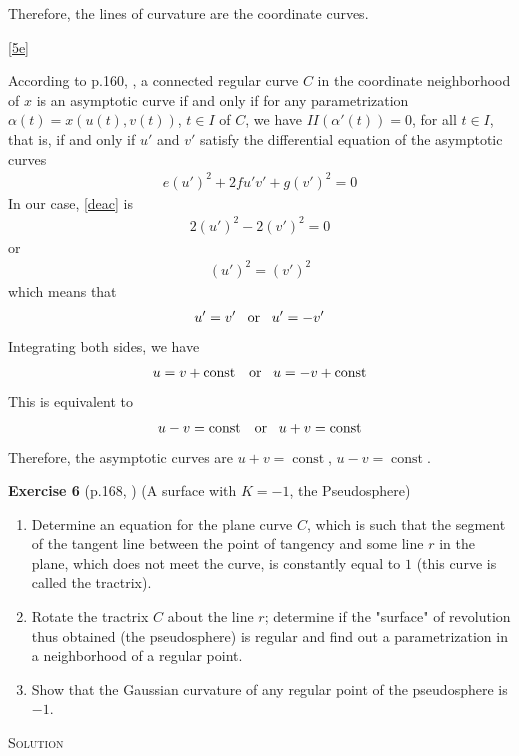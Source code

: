 \documentclass[a4paper]{report}
\DeclareMathOperator{\const}{const}
\begin{document}
Therefore, the lines of curvature are the coordinate curves.

\ref{5e}

According to p.160, \cite{2}, a connected regular curve $C$ in the coordinate neighborhood of $x$ is an asymptotic curve if and only if for any parametrization $\alpha(t) = x(u(t), v(t))$, $t \in I$ of $C$, we have $II(\alpha'(t)) = 0$, for all $t \in I$, that is, if and only if $u'$ and $v'$ satisfy the differential equation of the asymptotic curves
\begin{align}
	\label{deac}
	e(u′)^2 + 2fu′v′ + g(v′)^2 = 0
\end{align}
In our case, \eqref{deac} is
\begin{align}
2(u′)^2 - 2(v′)^2 = 0
\end{align}
or
\begin{align}
	\label{deac_1}
	(u′)^2 = (v′)^2
\end{align}
which means that
\begin{align}
	u' = v' \enskip\mbox{ or }\enskip u' = -v'
\end{align}
Integrating both sides, we have
\begin{align}
	u = v + \const \enskip\mbox{ or }\enskip u = -v + \const
\end{align}
This is equivalent to
\begin{align}
	u - v = \const \enskip\mbox{ or }\enskip u + v = \const
\end{align}
Therefore, the asymptotic curves are $u+v= \const$, $u - v = \const$.

\newpage
\textbf{Exercise 6} (p.168, \cite{2}) (A surface with $K = -1$, the Pseudosphere)
\begin{enumerate}[label=\textbf{(\alph*)}, leftmargin=*]
	\item\label{6a} Determine an equation for the plane curve $C$, which is such that the segment of the tangent line between the point of tangency and some line $r$ in the plane, which does not meet the curve, is constantly equal to $1$ (this curve is called the tractrix). 
	\item\label{6b} Rotate the tractrix $C$ about the line $r$; determine if the "surface" of revolution thus obtained (the pseudosphere) is regular and find out a parametrization in a neighborhood of a regular point. 
	\item\label{6c} Show that the Gaussian curvature of any regular point of the pseudosphere is $-1$.
\end{enumerate}
\textsc{Solution} 
\end{document}

